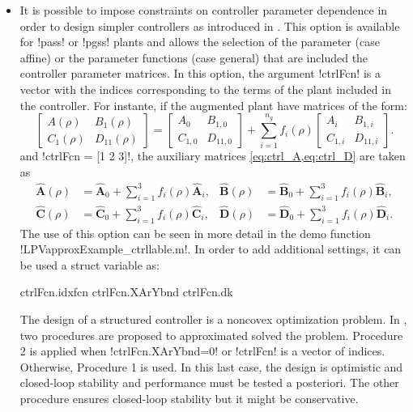 \documentclass[fleqn,11pt]{article}
\newcommand{\p}{\rho}
\newcommand{\Au}{\mathbf{\hat A}}
\newcommand{\Bu}{\mathbf{\hat B}}
\newcommand{\Cu}{\mathbf{\hat C}}
\newcommand{\Du}{\mathbf{\hat D}}
\begin{document}
\begin{itemize}
\begin{itemize}
              \item It is possible to impose constraints on controller parameter dependence in order to design simpler controllers as introduced in \cite{Bianchi2022}. This option is available for !pass! or !pgss! plants and allows the selection of the parameter (case affine) or the parameter functions (case general) that are included the controller parameter matrices. In this option, the argument !ctrlFcn! is a vector with the indices corresponding to the terms of the plant included in the controller. For instante, if the augmented plant have matrices of the form:
                  \begin{equation*}
                      \begin{bmatrix}
                          A(\p) & B_1(\p) \\
                          C_1(\p) & D_{11}(\p)
                      \end{bmatrix} =
                      \begin{bmatrix}
                          A_0 & B_{1,0} \\
                          C_{1,0} & D_{11,0}
                      \end{bmatrix} +
                      \sum^{n_g}_{i=1} f_i(\p)
                      \begin{bmatrix}
                          A_i & B_{1,i} \\
                          C_{1,i} & D_{11,i}
                      \end{bmatrix}.
                  \end{equation*}
                  and !ctrlFcn = [1 2 3]!, the auxiliary matrices \cref{eq:ctrl_A,eq:ctrl_D} are taken as
                  \begin{align*}
                        \Au(\p) &= \Au_0 + \sum_{i=1}^{3} f_i(\p) \Au_i,&
                        \Bu(\p) &= \Bu_0 + \sum_{i=1}^{3} f_i(\p) \Bu_i,\\
                        \Cu(\p) &= \Cu_0 + \sum_{i=1}^{3} f_i(\p) \Cu_i,&
                        \Du(\p) &= \Du_0 + \sum_{i=1}^{3} f_i(\p) \Du_i.
                  \end{align*}
                  The use of this option can be seen in more detail in the demo function !LPVapproxExample_ctrllable.m!.
                  In order to add additional settings, it can be used a struct variable as:
                  \begin{code}
ctrlFcn.idxfcn
ctrlFcn.XArYbnd
ctrlFcn.dk
                  \end{code}
                  The design of a structured controller is a noncovex optimization problem. In \cite{Bianchi2022}, two procedures are proposed to approximated solved the problem. Procedure 2 is applied when !ctrlFcn.XArYbnd=0! or !ctrlFcn! is a vector of indices. Otherwise, Procedure 1 is used. In this last case, the design is optimistic and closed-loop stability and performance must be tested a posteriori. The other procedure ensures closed-loop stability but it might be conservative.


\end{itemize}
\end{itemize}
\end{document}
